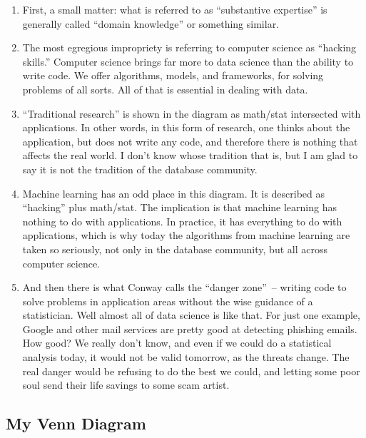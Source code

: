 \documentclass[11pt]{article}
\begin{document}
\begin{enumerate}

\item
First, a small matter: what is referred to as ``substantive expertise'' is generally called ``domain knowledge'' or something similar.

\item
The most egregious impropriety is referring to computer science as ``hacking skills.''  Computer science brings far more to data science than the ability to write code.  We offer algorithms, models, and frameworks, for solving problems of all sorts.  All of that is essential in dealing with data.

\item
``Traditional research'' is shown in the diagram as math/stat intersected with applications.  In other words, in this form of research, one thinks about the application, but does not write any code, and therefore there is nothing that affects the real world.  I don't know whose tradition that is, but I am glad to say it is not the tradition of the database community.

\item
Machine learning has an odd place in this diagram.  It is described as ``hacking'' plus math/stat.  The implication is that machine learning has nothing to do with applications.  In practice, it has everything to do with applications, which is why today the algorithms from machine learning are taken so seriously, not only in the database community, but all across computer science.

\item
And then there is what Conway calls the ``danger zone''~-- writing code to solve problems in application areas without the wise guidance of a statistician.  Well almost all of data science is like that.  For just one example, Google and other mail services are pretty good at detecting phishing emails.  How good?  We really don't know, and even if we could do a statistical analysis today, it would not be valid tomorrow, as the threats change.  The real danger would be refusing to do the best we could, and letting some poor soul send their life savings to some scam artist.

\end{enumerate}

\subsection{My Venn Diagram}
\end{document}
